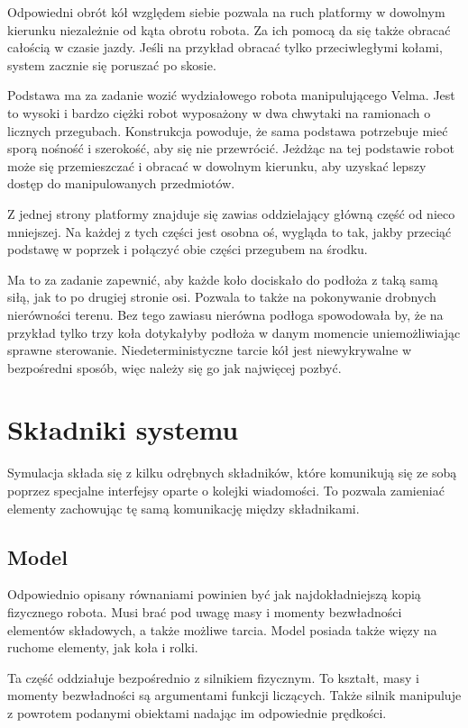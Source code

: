 Odpowiedni obrót kół względem siebie pozwala na ruch platformy w dowolnym kierunku niezależnie od kąta obrotu robota.
Za ich pomocą da się także obracać całością w czasie jazdy.
Jeśli na przykład obracać tylko przeciwległymi kołami, system zacznie się poruszać po skosie.

Podstawa ma za zadanie wozić wydziałowego robota manipulującego Velma.
Jest to wysoki i bardzo ciężki robot wyposażony w dwa chwytaki na ramionach o licznych przegubach.
Konstrukcja powoduje, że sama podstawa potrzebuje mieć sporą nośność i szerokość, aby się nie przewrócić.
Jeżdżąc na tej podstawie robot może się przemieszczać i obracać w dowolnym kierunku, aby uzyskać lepszy dostęp do manipulowanych przedmiotów.

Z jednej strony platformy znajduje się zawias oddzielający główną część od nieco mniejszej.
Na każdej z tych części jest osobna oś, wygląda to tak, jakby przeciąć podstawę w poprzek i połączyć obie części przegubem na środku.

Ma to za zadanie zapewnić, aby każde koło dociskało do podłoża z taką samą siłą, jak to po drugiej stronie osi.
Pozwala to także na pokonywanie drobnych nierówności terenu.
Bez tego zawiasu nierówna podłoga spowodowała by, że na przykład tylko trzy koła dotykałyby podłoża w danym momencie uniemożliwiając sprawne sterowanie.
Niedeterministyczne tarcie kół jest niewykrywalne w bezpośredni sposób, więc należy się go jak najwięcej pozbyć.

\section{Składniki systemu}
Symulacja składa się z kilku odrębnych składników, które komunikują się ze sobą poprzez specjalne interfejsy oparte o kolejki wiadomości.
To pozwala zamieniać elementy zachowując tę samą komunikację między składnikami.

\subsection{Model}
 Odpowiednio opisany równaniami powinien być jak najdokładniejszą kopią fizycznego robota.
 Musi brać pod uwagę masy i momenty bezwładności elementów składowych, a także możliwe tarcia.
 Model posiada także więzy na ruchome elementy, jak koła i rolki.
 
 Ta część oddziałuje bezpośrednio z silnikiem fizycznym. 
 To kształt, masy i momenty bezwładności są argumentami funkcji liczących.
 Także silnik manipuluje z powrotem podanymi obiektami nadając im odpowiednie prędkości.
 
